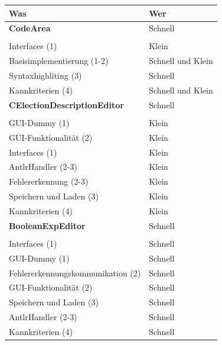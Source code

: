 \documentclass[a4paper]{scrreprt}
\begin{document}
\begin{tabular}{ | p{7cm} | p{7cm} |}
    \hline
	Was & Wer\\
	\hline
	
	\rule{0pt}{15pt}\textbf {CodeArea} & Schnell\\
	&\\
	\hline
	Interfaces (1) & Klein\\
	\hline
	Basisimplementierung (1-2) & Schnell und Klein\\
	\hline
	Syntaxhighliting (3) & Schnell \\
	\hline
	Kannkriterien (4) & Schnell und Klein \\
	\hline
	
	\rule{0pt}{15pt}\textbf {CElectionDescriptionEditor} & Schnell\\
	&\\
	\hline
	GUI-Dummy (1) & Klein \\
	\hline
	GUI-Funktionalität (2) & Klein\\
	\hline
	Interfaces (1) & Klein\\
	\hline
	AntlrHandler (2-3) & Klein\\
	\hline
	Fehlererkennung (2-3) & Klein\\
	\hline
	Speichern und Laden (3) & Klein\\
	\hline
	Kannkriterien (4) & Klein\\
	\hline
	
	\rule{0pt}{15pt}\textbf {BooleanExpEditor} &  Schnell \\
	&\\
	\hline
	Interfaces (1) & Schnell\\
	\hline
	GUI-Dummy (1) & Schnell\\
	\hline
	Fehlererkennungskommunikation (2) & Schnell\\
	\hline
	GUI-Funktionalität (2) & Schnell\\
	\hline
	Speichern und Laden (3) & Schnell\\
	\hline	
	AntlrHandler (2-3) & Schnell\\
	\hline
	Kannkriterien (4) & Schnell\\
	\hline
	

\end{tabular}
\end{document}
